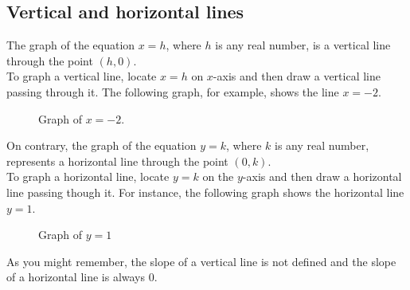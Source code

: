 \subsection{Vertical and horizontal lines}
The graph of the equation $x=h$, where $h$ is any real number, is a vertical line through the point $(h,0)$.\\
To graph a vertical line, locate $x=h$ on $x$-axis and then draw a vertical line passing through it. The following graph, for example, shows the line $x=-2$.

\vspace{0.4cm}
\begin{figure}[ht]
\centering
{}
    \caption{Graph of $x=-2$.}
\end{figure}
\vspace{0.4cm}
On contrary, the graph of the equation $y=k$, where $k$ is any real number, represents a horizontal line through the point $(0,k)$.\\
To graph a horizontal line, locate $y=k$ on the $y$-axis and then draw a horizontal line passing though it. For instance, the following graph shows the horizontal line $y=1$. 
\begin{figure}[ht]
\centering
{}
\caption{Graph of $y=1$}
\end{figure}

\newpage
As you might remember, the slope of a vertical line is not defined and the slope of a horizontal line is always 0.
